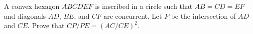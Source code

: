 A convex hexagon $ABCDEF$ is inscribed in a circle such that $AB = CD = EF$ and diagonals $AD$,  $BE$,  and $CF$ are concurrent. Let $P$ be the intersection of $AD$ and $CE$. Prove that $CP/PE = (AC/CE)^2$.